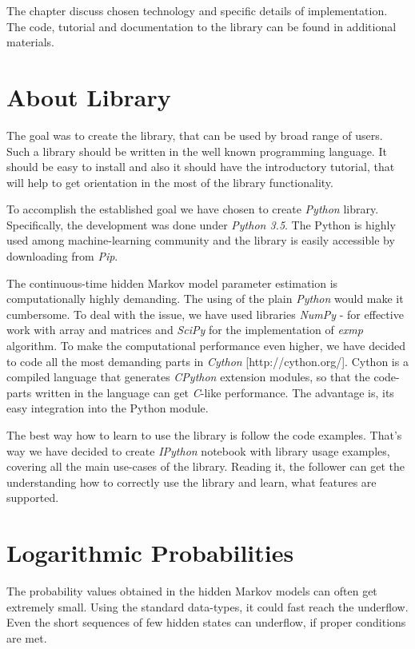 \documentclass[thesis=M,english]{FITthesis}[2012/10/20]
\begin{document}
The chapter discuss chosen technology and specific details of implementation. 
The code, tutorial and documentation to the library can be found in additional materials.

\section{About Library}

The goal was to create the library, that can be used by broad range of users. Such a library should be written in the well known programming language. It should be easy to install and also it should have the introductory tutorial, that will help to get orientation in the most of the library functionality. 

To accomplish the established goal we have chosen to create \textit{Python} library. Specifically, the development was done under \textit{Python 3.5}. The Python is highly used among machine-learning community and the library is easily accessible by downloading from \textit{Pip}. %

The continuous-time hidden Markov model parameter estimation is computationally highly demanding. The using of the plain \textit{Python} would make it cumbersome. To deal with the issue, we have used libraries \textit{NumPy} - for effective work with array and matrices and \textit{SciPy} for the implementation of \textit{exmp} algorithm. To make the computational performance even higher, we have decided to code all the most demanding parts in \textit{Cython} [http://cython.org/]. Cython is a compiled language that generates \textit{CPython} extension modules, so that the code-parts written in the language can get \textit{C}-like performance. The advantage is, its easy integration into the Python module.

The best way how to learn to use the library is follow the code examples. That's way we have decided to create \textit{IPython} notebook with library usage examples, covering all the main use-cases of the library. Reading it, the follower can get the understanding how to correctly use the library and learn, what features are supported.          


\section{Logarithmic Probabilities}

The probability values obtained in the hidden Markov models can often get extremely small. Using the standard data-types, it could fast reach the underflow. Even the short sequences of few hidden states can underflow, if proper conditions are met. 
\end{document}
